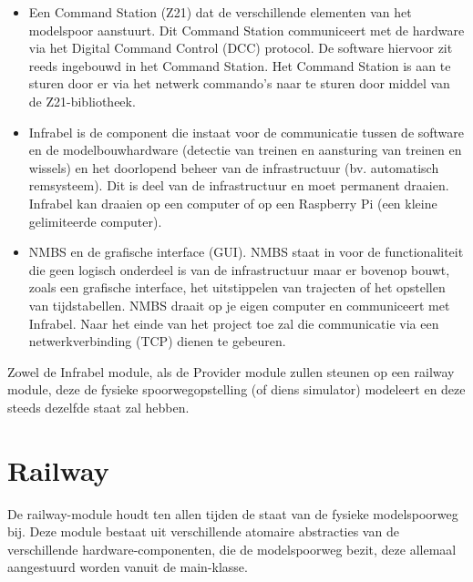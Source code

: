 \documentclass[a4paper, 11pt]{article}
\newcommand{\<}{\scriptsize\textless\normalsize}
\renewcommand{\>}{\scriptsize\textgreater\normalsize}
\begin{document}
\begin{itemize}
	\item Een Command Station (Z21) dat de verschillende elementen van het modelspoor aanstuurt. Dit Command Station communiceert met de hardware via het Digital Command Control (DCC) protocol. De software hiervoor zit reeds ingebouwd in het Command Station. Het Command Station is aan te sturen door er via het netwerk commando’s naar te sturen door middel van de Z21-bibliotheek.
	\item Infrabel is de component die instaat voor de communicatie tussen de software en de
	modelbouwhardware (detectie van treinen en aansturing van treinen en wissels) en het
	doorlopend beheer van de infrastructuur (bv. automatisch remsysteem). Dit is deel van de infrastructuur en moet permanent draaien. Infrabel kan draaien op een computer of op een Raspberry Pi (een kleine gelimiteerde computer).
	\item NMBS en de grafische interface (GUI). NMBS staat in voor de functionaliteit die geen
	logisch onderdeel is van de infrastructuur maar er bovenop bouwt, zoals een grafische
	interface, het uitstippelen van trajecten of het opstellen van tijdstabellen. NMBS draait
	op je eigen computer en communiceert met Infrabel. Naar het einde van het project toe
	zal die communicatie via een netwerkverbinding (TCP) dienen te gebeuren.
\end{itemize}
Zowel de Infrabel module, als de Provider module zullen steunen op een railway module, deze de fysieke spoorwegopstelling (of diens simulator) modeleert en deze steeds dezelfde staat zal hebben.
\newpage

\section{Railway} %
De railway-module houdt ten allen tijden de staat van de fysieke modelspoorweg bij. Deze module bestaat uit verschillende atomaire abstracties van de verschillende hardware-componenten, die de modelspoorweg bezit, deze allemaal aangestuurd worden vanuit de main-klasse.
\end{document}
